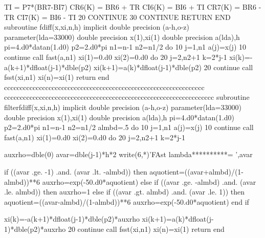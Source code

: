           TI = P7*(BR7-BI7)
          CR6(K) = BR6 + TR
          CI6(K) = BI6 + TI
          CR7(K) = BR6 - TR
          CI7(K) = BI6 - TI
 20     CONTINUE
 30   CONTINUE
      RETURN
      END
        subroutine fdiff(x,xi,n,h)
        implicit double precision (a-h,o-z)
        parameter(lda=33000)
        double precision x(1),xi(1)
        double precision a(lda),h
        pi=4.d0*datan(1.d0)
        p2=2.d0*pi
        n1=n-1
        n2=n1/2
        do 10 j=1,n1
        a(j)=x(j)
 10     continue
        call fast(a,n1)
        xi(1)=0.d0
        xi(2)=0.d0
        do 20 j=2,n2+1
        k=2*j-1
        xi(k)=-a(k+1)*dfloat(j-1)*dble(p2)
        xi(k+1)=a(k)*dfloat(j-1)*dble(p2)
 20     continue
        call fsst(xi,n1)
        xi(n)=xi(1)
        return
        end
ccccccccccccccccccccccccccccccccccccccccccccccccccccccccccccccc
cccccccccccccccccccccccccccccccccccccccccccccccccccccccccccccccccc
        subroutine filterfdiff(x,xi,n,h)
        implicit double precision (a-h,o-z)
        parameter(lda=33000)
        double precision x(1),xi(1)
        double precision a(lda),h
        pi=4.d0*datan(1.d0)
        p2=2.d0*pi
        n1=n-1
        n2=n1/2
        almbd=.5
        do 10 j=1,n1
        a(j)=x(j)
 10     continue
        call fast(a,n1)
        xi(1)=0.d0
        xi(2)=0.d0
        do 20 j=2,n2+1
        k=2*j-1
       
          auxrho=dble(0)
          avar=dble(j-1)*h*2
          write(6,*)'FAst lambda**********= ',avar

          if ((avar .ge. -1) .and. (avar .lt. -almbd)) then
             aquotient=((avar+almbd)/(1-almbd))**6
             auxrho=exp(-50.d0*aquotient)
          else if ((avar .ge. -almbd) .and. (avar .le. almbd)) then
             auxrho=1
          else if ((avar .gt. almbd) .and. (avar .le. 1)) then
             aquotient=((avar-almbd)/(1-almbd))**6
             auxrho=exp(-50.d0*aquotient)             
          end if
              
        xi(k)=-a(k+1)*dfloat(j-1)*dble(p2)*auxrho
        xi(k+1)=a(k)*dfloat(j-1)*dble(p2)*auxrho
 20     continue
        call fsst(xi,n1)
        xi(n)=xi(1)
        return
        end

